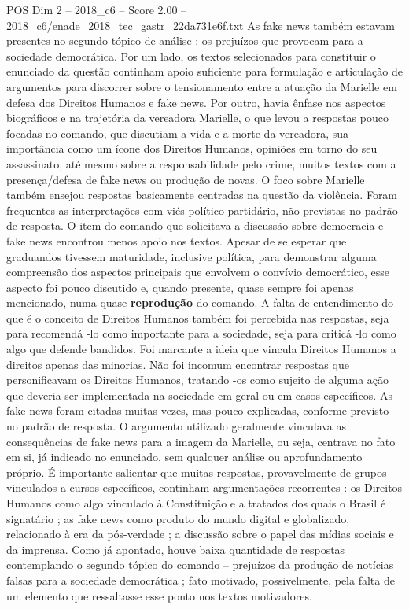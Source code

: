 \begin{textsample}{POS Dim 2 – 2018\_c6 – Score 2.00 – 2018\_c6/enade\_2018\_tec\_gastr\_22da731e6f.txt}
As fake news também estavam presentes no segundo tópico de análise : os prejuízos que provocam para a sociedade democrática.
Por um lado, os textos selecionados para constituir o enunciado da questão continham apoio suficiente para formulação e articulação de argumentos para discorrer sobre o tensionamento entre a atuação da Marielle em defesa dos Direitos Humanos e fake news.
Por outro, havia ênfase nos aspectos biográficos e na trajetória da vereadora Marielle, o que levou a respostas pouco focadas no comando, que discutiam a vida e a morte da vereadora, sua importância como um ícone dos Direitos Humanos, opiniões em torno do seu assassinato, até mesmo sobre a responsabilidade pelo crime, muitos textos com a presença/defesa de fake news ou produção de novas.
O foco sobre Marielle também ensejou respostas basicamente centradas na questão da violência.
Foram frequentes as interpretações com viés político-partidário, não previstas no padrão de resposta.
O item do comando que solicitava a discussão sobre democracia e fake news encontrou menos apoio nos textos.
Apesar de se esperar que graduandos tivessem maturidade, inclusive política, para demonstrar alguma compreensão dos aspectos principais que envolvem o convívio democrático, esse aspecto foi pouco discutido e, quando presente, quase sempre foi apenas mencionado, numa quase \textbf{reprodução} do comando.
A falta de entendimento do que é o conceito de Direitos Humanos também foi percebida nas respostas, seja para recomendá -lo como importante para a sociedade, seja para criticá -lo como algo que defende bandidos.
Foi marcante a ideia que vincula Direitos Humanos a direitos apenas das minorias.
Não foi incomum encontrar respostas que personificavam os Direitos Humanos, tratando -os como sujeito de alguma ação que deveria ser implementada na sociedade em geral ou em casos específicos.
As fake news foram citadas muitas vezes, mas pouco explicadas, conforme previsto no padrão de resposta.
O argumento utilizado geralmente vinculava as consequências de fake news para a imagem da Marielle, ou seja, centrava no fato em si, já indicado no enunciado, sem qualquer análise ou aprofundamento próprio.
É importante salientar que muitas respostas, provavelmente de grupos vinculados a cursos específicos, continham argumentações recorrentes : os Direitos Humanos como algo vinculado à Constituição e a tratados dos quais o Brasil é signatário ; as fake news como produto do mundo digital e globalizado, relacionado à era da pós-verdade ; a discussão sobre o papel das mídias sociais e da imprensa.
Como já apontado, houve baixa quantidade de respostas contemplando o segundo tópico do comando – prejuízos da produção de notícias falsas para a sociedade democrática ; fato motivado, possivelmente, pela falta de um elemento que ressaltasse esse ponto nos textos motivadores.

\end{textsample}
